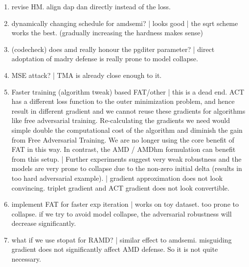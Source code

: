 \begin{enumerate}

	\item [\cmark] revise HM. align dap dan directly instead of the loss.

	\item [\cmark] \checkmark dynamically changing schedule for amdsemi? |
		looks good | the sqrt scheme works the best. (gradually increasing the
		hardness makes sense)

	\item [\cmark] (codecheck) does amd really honour the pgditer parameter? |
		direct adoptation of madry defense is really prone to model collapse.

	\item [\xmark] MSE attack? | TMA is already close enough to it.

	\item [\xmark] Faster training (algorithm tweak) based FAT/other | this is
		a dead end. ACT has a different loss function to the outer minimization
		problem, and hence result in different gradient and we cannot reuse
		these gradients for algorithms like free adversarial training.
		Re-calculating the gradients we need would simple double the
		computational cost of the algorithm and diminish the gain from Free
		Adversarial Training. We are no longer using the core benefit of FAT in
		this way. In contrast, the AMD / AMDhm formulation can benefit from
		this setup. | Further experiments suggest very weak robustness and the
		models are very prone to collapse due to the non-zero initial delta
		(results in too hard adversarial example).  | gradient approximation
		does not look convincing. triplet gradient and ACT gradient does not
		look convertible.

	\item [\cmark] implement FAT for faster exp iteration | works on toy
		dataset. too prone to collapse. if we try to avoid model collapse, the
		adversarial robustness will decrease significantly.

	\item [\cmark] what if we use stopat for RAMD? | similar effect to amdsemi.
		misguiding gradient does not significantly affect AMD defense. So it
		is not quite necessary.
	
\end{enumerate}
